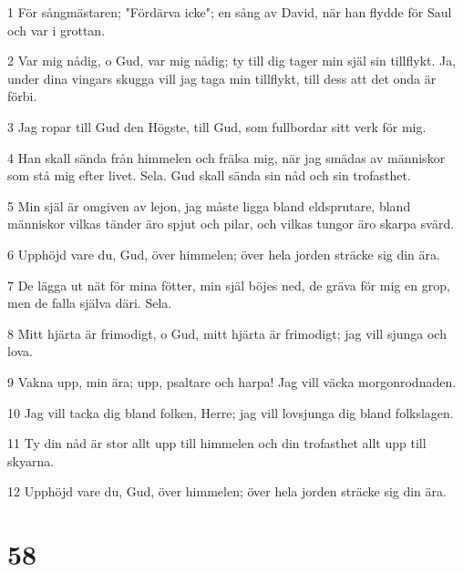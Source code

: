 \par 1 För sångmästaren; "Fördärva icke"; en sång av David, när han flydde för Saul och var i grottan.
\par 2 Var mig nådig, o Gud, var mig nådig; ty till dig tager min själ sin tillflykt. Ja, under dina vingars skugga vill jag taga min tillflykt, till dess att det onda är förbi.
\par 3 Jag ropar till Gud den Högste, till Gud, som fullbordar sitt verk för mig.
\par 4 Han skall sända från himmelen och frälsa mig, när jag smädas av människor som stå mig efter livet. Sela. Gud skall sända sin nåd och sin trofasthet.
\par 5 Min själ är omgiven av lejon, jag måste ligga bland eldsprutare, bland människor vilkas tänder äro spjut och pilar, och vilkas tungor äro skarpa svärd.
\par 6 Upphöjd vare du, Gud, över himmelen; över hela jorden sträcke sig din ära.
\par 7 De lägga ut nät för mina fötter, min själ böjes ned, de gräva för mig en grop, men de falla själva däri. Sela.
\par 8 Mitt hjärta är frimodigt, o Gud, mitt hjärta är frimodigt; jag vill sjunga och lova.
\par 9 Vakna upp, min ära; upp, psaltare och harpa! Jag vill väcka morgonrodnaden.
\par 10 Jag vill tacka dig bland folken, Herre; jag vill lovsjunga dig bland folkslagen.
\par 11 Ty din nåd är stor allt upp till himmelen och din trofasthet allt upp till skyarna.
\par 12 Upphöjd vare du, Gud, över himmelen; över hela jorden sträcke sig din ära.

\chapter{58}

